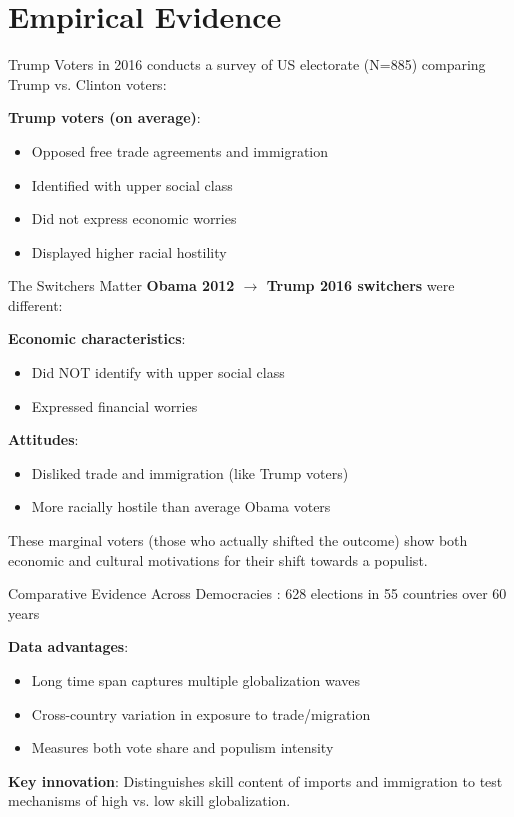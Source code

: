 \documentclass{beamer}
\begin{document}
\section{Empirical Evidence}

\begin{frame}{Trump Voters in 2016}
\textcite{rodrik_annual_reviews_populism_globalization} conducts a survey of US electorate (N=885) comparing Trump vs. Clinton voters:
\vspace{0.3cm}

\textbf{Trump voters (on average)}:
\begin{itemize}
    \item Opposed free trade agreements and immigration
    \item Identified with upper social class
    \item Did not express economic worries
    \item Displayed higher racial hostility
\end{itemize}
\end{frame}

\begin{frame}{The Switchers Matter}
\textbf{Obama 2012 $\rightarrow$ Trump 2016 switchers} were different:
\vspace{0.3cm}

\textbf{Economic characteristics}:
\begin{itemize}
    \item Did NOT identify with upper social class
    \item Expressed financial worries
\end{itemize}
\vspace{0.3cm}
\textbf{Attitudes}:
\begin{itemize}
    \item Disliked trade and immigration (like Trump voters)
    \item More racially hostile than average Obama voters
\end{itemize}
\vspace{0.3cm}
These marginal voters (those who actually shifted the outcome) show both economic and cultural motivations for their shift towards a populist.
\end{frame}

\begin{frame}{Comparative Evidence Across Democracies}
\textcite{globalization_and_populism}: 628 elections in 55 countries over 60 years
\vspace{0.3cm}

\textbf{Data advantages}:
\begin{itemize}
    \item Long time span captures multiple globalization waves
    \item Cross-country variation in exposure to trade/migration
    \item Measures both vote share and populism intensity
\end{itemize}
\vspace{0.3cm}
\textbf{Key innovation}: Distinguishes skill content of imports and immigration to test mechanisms of high vs. low skill globalization.
\end{frame}
\end{document}
